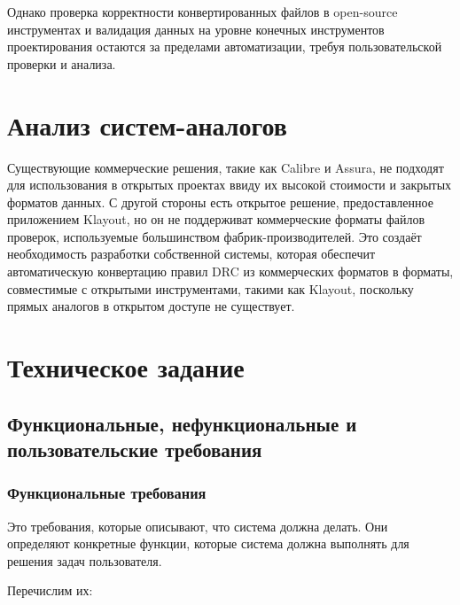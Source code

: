Однако проверка корректности конвертированных файлов
в open-source инструментах
и валидация данных на уровне конечных инструментов проектирования остаются
за пределами автоматизации, требуя пользовательской проверки и анализа.

\section{Анализ систем-аналогов}

Существующие коммерческие решения, такие как Calibre и Assura,
не подходят для использования в открытых проектах ввиду их высокой стоимости
и закрытых форматов данных.
С другой стороны есть открытое решение, предоставленное приложением Klayout,
но он не поддерживат коммерческие форматы файлов проверок,
используемые большинством фабрик-производителей.
Это создаёт необходимость разработки собственной системы,
которая обеспечит автоматическую конвертацию правил DRC
из коммерческих форматов в форматы, совместимые с открытыми инструментами,
такими как Klayout,
поскольку прямых аналогов в открытом доступе не существует.

\clearpage  %

\section{Техническое задание}

\subsection{Функциональные, нефункциональные и пользовательские требования}

\subsubsection{Функциональные требования}

Это требования, которые описывают, что система должна делать.
Они определяют конкретные функции,
которые система должна выполнять для решения задач пользователя.

Перечислим их:

